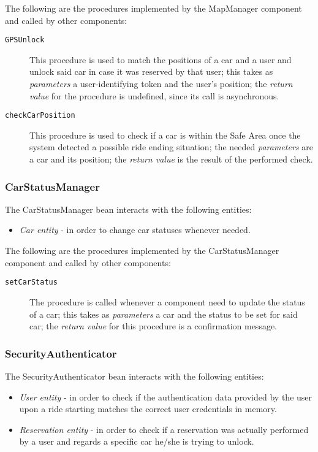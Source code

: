 The following are the procedures implemented by the MapManager component and called by other components:
\begin{description}
\item[\texttt{GPSUnlock}] This procedure is used to match the positions of a car and a user and unlock said car in case it was reserved by that user; this takes as \textit{parameters} a user-identifying token and the user's position; the \textit{return value} for the procedure is undefined, since its call is asynchronous.
\item[\texttt{checkCarPosition}] This procedure is used to check if a car is within the Safe Area once the system detected a possible ride ending situation; the needed \textit{parameters} are a car and its position; the \textit{return value} is the result of the performed check.
\end{description}
\subsubsection{CarStatusManager}
The CarStatusManager bean interacts with the following entities:
\begin{itemize}
\item \textit{Car entity} - in order to change car statuses whenever needed.
\end{itemize}

The following are the procedures implemented by the CarStatusManager component and called by other components:
\begin{description}
\item[\texttt{setCarStatus}] The procedure is called whenever a component need to update the status of a car; this takes as \textit{parameters} a car and the status to be set for said car; the \textit{return value} for this procedure is a confirmation message.
\end{description}
\subsubsection{SecurityAuthenticator}
The SecurityAuthenticator bean interacts with the following entities:
\begin{itemize}
\item \textit{User entity} - in order to check if the authentication data provided by the user upon a ride starting matches the correct user credentials in memory.
\item \textit{Reservation entity} - in order to check if a reservation was actually performed by a user and regards a specific car he/she is trying to unlock.
\end{itemize}

